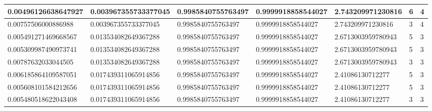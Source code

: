 \documentclass[12pt, letterpaper]{article}
\begin{document}
\begin{minipage}{\linewidth}
{{\begin{tabular}{|l|l|l|l|l|l|l|}
   0.00496126638647927   & 0.003967355733377045 & 0.9985840755763497 & 0.9999918858544027 & 2.743209971230816  & 6 & 4 \\ \hline
   0.00757506000886988   & 0.003967355733377045 & 0.9985840755763497 & 0.9999918858544027 & 2.743209971230816  & 3 & 4 \\ \hline
   0.005491271469668567  & 0.013534082649367288 & 0.9985840755763497 & 0.9999918858544027 & 2.6713003959780943 & 5 & 3 \\ \hline
   0.005309987490973741  & 0.013534082649367288 & 0.9985840755763497 & 0.9999918858544027 & 2.6713003959780943 & 5 & 3 \\ \hline
   0.00787632033044505   & 0.013534082649367288 & 0.9985840755763497 & 0.9999918858544027 & 2.6713003959780943 & 3 & 3 \\ \hline
   0.006185864109587051  & 0.017439311065914856 & 0.9985840755763497 & 0.9999918858544027 & 2.41086130712277   & 5 & 3 \\ \hline
   0.005608101584212656  & 0.017439311065914856 & 0.9985840755763497 & 0.9999918858544027 & 2.41086130712277   & 5 & 3 \\ \hline
   0.005480518622043408  & 0.017439311065914856 & 0.9985840755763497 & 0.9999918858544027 & 2.41086130712277   & 3 & 3 \\ \hline
   \end{tabular}}}

   \label{tab:yourtable}


\end{minipage}
\end{document}
